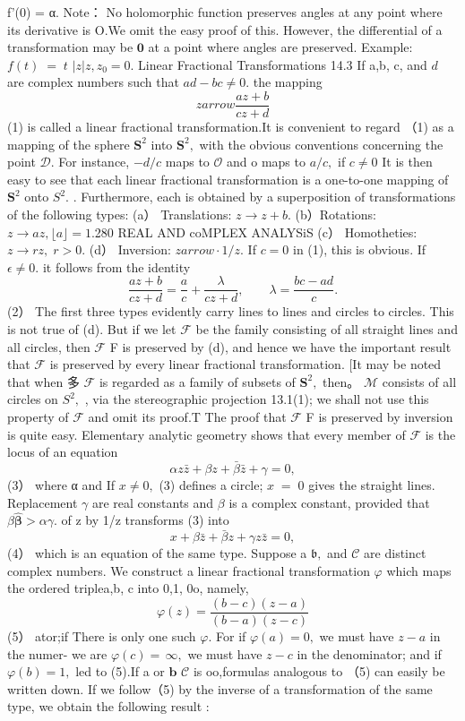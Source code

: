 f'(0) = α. Note： No holomorphic function preserves angles at any point where its derivative is O.We omit the easy proof of this. However, the differential of a transformation may be $\mathbf{0}$ at a point where angles are preserved. Example: $\scriptstyle{f(t)\;=\;t}$ $|z|z,z_{0}=0.$ Linear Fractional Transformations 14.3 If a,b, c, and $d$ are complex numbers such that $a d-b c\neq0.$ the mapping $$ z arrow{\frac{a z+b}{c z+d}} $$ (1) is called a linear fractional transformation.It is convenient to regard （1) as a mapping of the sphere ${\boldsymbol{S}}^{2}$ into ${\boldsymbol{S}}^{2},$ with the obvious conventions concerning the point ${\mathcal{D}}.$ For instance, $-d/c$ maps to ${\mathcal{O}}$ and o maps to $a/c,$ if $\scriptstyle c\neq0$ It is then easy to see that each linear fractional transformation is a one-to-one mapping of ${\boldsymbol{S}}^{2}$ onto $S^{2}.$ . Furthermore, each is obtained by a superposition of transformations of the following types: (a） Translations: $z\to z+b.$ (b）Rotations: $z\to a z,\lfloor a\rfloor=1.$280 REAL AND coMPLEX ANALYSiS (c） Homotheties: $z\to r z,\;r>0.$ (d） Inversion: $z arrow\cdot1/z.$ If $\scriptstyle c=0$ in (1), this is obvious. If $\epsilon\neq0.$ it follows from the identity $$ {\frac{a z+b}{c z+d}}={\frac{a}{c}}+{\frac{\lambda}{c z+d}},\qquad\lambda={\frac{b c-a d}{c}}. $$ (2） The first three types evidently carry lines to lines and circles to circles. This is not true of (d). But if we let $\mathcal{F}$ be the family consisting of all straight lines and all circles, then $\textstyle{\mathcal{F}}$ F is preserved by (d), and hence we have the important result that $\mathcal{F}$ is preserved by every linear fractional transformation. [It may be noted that when 多 $\mathcal{F}$ is regarded as a family of subsets of ${\boldsymbol{S}}^{2},$ then。 ${\mathcal{M}}$ consists of all circles on $S^{2},$ , via the stereographic projection 13.1(1); we shall not use this property of $\mathcal{F}$ and omit its proof.T The proof that $\mathcal{F}$ F is preserved by inversion is quite easy. Elementary analytic geometry shows that every member of $\mathcal{F}$ is the locus of an equation $$ \alpha z{\bar{z}}+\beta z+{\bar{\beta}}{\bar{z}}+\gamma=0, $$ (3） where α and If $x\neq0,$ (3) defines a circle; $\scriptstyle x\;=\;0$ gives the straight lines. Replacement $\gamma$ are real constants and $\beta$ is a complex constant, provided that $\beta{\hat{\boldsymbol{\beta}}}>\alpha\gamma.$ of z by 1/z transforms (3) into $$ x+\beta\bar{z}+\bar{\beta}z+\gamma z\bar{z}=0, $$ (4） which is an equation of the same type. Suppose a ${\mathfrak{b}},$ and $\scriptstyle{\mathcal{C}}$ are distinct complex numbers. We construct a linear fractional transformation $\varphi$ which maps the ordered triple{a,b, c} into {0,1, 0o}, namely, $$ \varphi(z)={\frac{(b-c)(z-a)}{(b-a)(z-c)}} $$ (5） ator;if There is only one such $\varphi.$ For if $\varphi(a)=0,$ we must have $z-a$ in the numer- we are $\varphi(c)=\,\infty,$ we must have $z-c$ in the denominator; and if $\varphi(b)=1,$ led to (5).If a or ${\boldsymbol{b}}$ $\scriptstyle{\mathcal{C}}$ is oo,formulas analogous to （5) can easily be written down. If we follow（5) by the inverse of a transformation of the same type, we obtain the following result : 